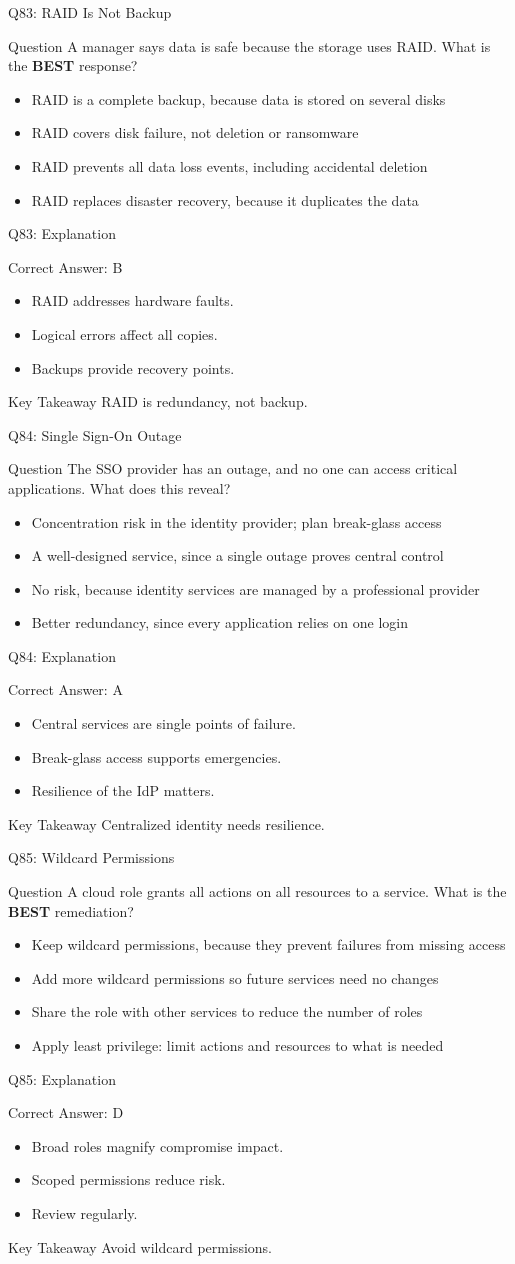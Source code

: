 \documentclass[aspectratio=169]{beamer}
\newcommand{\hq}[7]{%
	\begin{frame}{Q#1: #2}
		\begin{block}{Question}
			#3
		\end{block}
		\begin{itemize}
			#4
		\end{itemize}
	\end{frame}
	\begin{frame}{Q#1: Explanation}
		\begin{block}{Correct Answer: #5}
			\begin{itemize}
				#6
			\end{itemize}
		\end{block}
		\begin{alertblock}{Key Takeaway}
			#7
		\end{alertblock}
	\end{frame}
}
\begin{document}
	\hq{83}{RAID Is Not Backup}
	{A manager says data is safe because the storage uses RAID. What is the \textbf{BEST} response?}
	{\item[\textbf{(A)}] RAID is a complete backup, because data is stored on several disks
		\item[\textbf{(B)}] RAID covers disk failure, not deletion or ransomware
		\item[\textbf{(C)}] RAID prevents all data loss events, including accidental deletion
		\item[\textbf{(D)}] RAID replaces disaster recovery, because it duplicates the data}
	{B}
	{\item RAID addresses hardware faults.
		\item Logical errors affect all copies.
		\item Backups provide recovery points.}
	{RAID is redundancy, not backup.}

	\hq{84}{Single Sign-On Outage}
	{The SSO provider has an outage, and no one can access critical applications. What does this reveal?}
	{\item[\textbf{(A)}] Concentration risk in the identity provider; plan break-glass access
		\item[\textbf{(B)}] A well-designed service, since a single outage proves central control
		\item[\textbf{(C)}] No risk, because identity services are managed by a professional provider
		\item[\textbf{(D)}] Better redundancy, since every application relies on one login}
	{A}
	{\item Central services are single points of failure.
		\item Break-glass access supports emergencies.
		\item Resilience of the IdP matters.}
	{Centralized identity needs resilience.}

	\hq{85}{Wildcard Permissions}
	{A cloud role grants all actions on all resources to a service. What is the \textbf{BEST} remediation?}
	{\item[\textbf{(A)}] Keep wildcard permissions, because they prevent failures from missing access
		\item[\textbf{(B)}] Add more wildcard permissions so future services need no changes
		\item[\textbf{(C)}] Share the role with other services to reduce the number of roles
		\item[\textbf{(D)}] Apply least privilege: limit actions and resources to what is needed}
	{D}
	{\item Broad roles magnify compromise impact.
		\item Scoped permissions reduce risk.
		\item Review regularly.}
	{Avoid wildcard permissions.}
\end{document}
